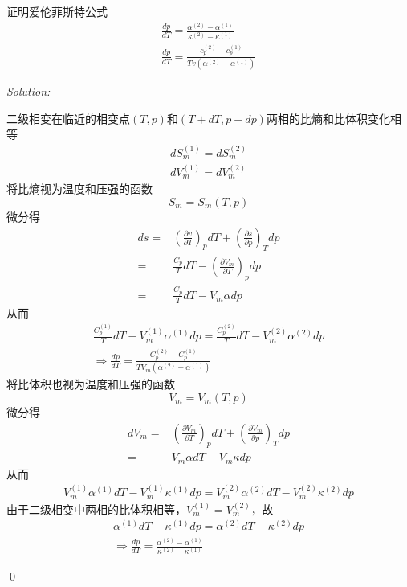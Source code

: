 \documentclass[12pt,a4paper]{article}
\newenvironment{problem}[2][Problem]{\begin{trivlist}
\item[\hskip \labelsep {\bfseries #1}\hskip \labelsep {\bfseries #2.}]}{\end{trivlist}}
\newenvironment{sol}
    {\emph{Solution:}
    }
    {
    \qed
    }
\begin{document}
\begin{problem}{3.16}
证明爱伦菲斯特公式
\begin{gather*}
\frac{dp}{dT}=\frac{\alpha^{(2)}-\alpha^{(1)}}{\kappa^{(2)}-\kappa^{(1)}}\\
\frac{dp}{dT}=\frac{c_p^{(2)}-c_p^{(1)}}{Tv(\alpha^{(2)}-\alpha^{(1)})}
\end{gather*}
\end{problem}
\begin{sol}
二级相变在临近的相变点$(T,p)$和$(T+dT,p+dp)$两相的比熵和比体积变化相等
\begin{gather}
dS_m^{(1)}=dS_m^{(2)}\\
dV_m^{(1)}=dV_m^{(2)}
\end{gather}
将比熵视为温度和压强的函数
\begin{equation}
S_m=S_m(T,p)
\end{equation}
微分得
\begin{align}
\nonumber ds=&\left(\frac{\partial v}{\partial T}\right)_pdT+\left(\frac{\partial s}{\partial p}\right)_Tdp\\
\nonumber =&\frac{C_p}{T}dT-\left(\frac{\partial V_m}{\partial T}\right)_pdp\\
=&\frac{C_p}{T}dT-V_m\alpha dp
\end{align}
从而
\begin{gather}
\frac{C_p^{(1)}}{T}dT-V_m^{(1)}\alpha^{(1)}dp=\frac{C_p^{(2)}}{T}dT-V_m^{(2)}\alpha^{(2)}dp\\
\Longrightarrow\frac{dp}{dT}=\frac{C_p^{(2)}-C_p^{(1)}}{TV_m(\alpha^{(2)}-\alpha^{(1)})}
\end{gather}
将比体积也视为温度和压强的函数
\begin{equation}
V_m=V_m(T,p)
\end{equation}
微分得
\begin{align}
\nonumber dV_m=&\left(\frac{\partial V_m}{\partial T}\right)_pdT+\left(\frac{\partial V_m}{\partial p}\right)_Tdp\\
=&V_m\alpha dT-V_m\kappa dp
\end{align}
从而
\begin{gather}
V_m^{(1)}\alpha^{(1)} dT-V_m^{(1)}\kappa^{(1)}dp=V_m^{(2)}\alpha^{(2)}dT-V_m^{(2)}\kappa^{(2)}dp
\end{gather}
由于二级相变中两相的比体积相等，$V_m^{(1)}=V_m^{(2)}$，故
\begin{gather}
\alpha^{(1)} dT-\kappa^{(1)}dp=\alpha^{(2)}dT-\kappa^{(2)}dp\\
\Longrightarrow\frac{dp}{dT}=\frac{\alpha^{(2)}-\alpha^{(1)}}{\kappa^{(2)}-\kappa^{(1)}}
\end{gather}
\end{sol}
\end{document}

